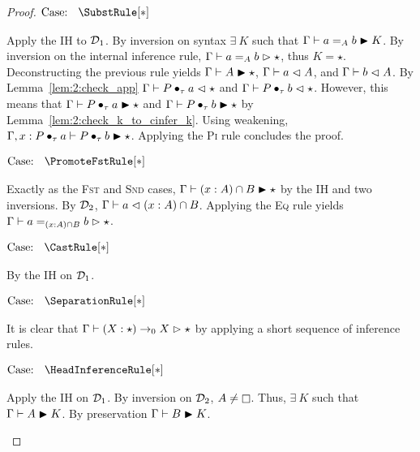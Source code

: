 \begin{proof}
    $\text{Case: }\begin{array}{c} \SubstRule[*] \end{array}$
    \begin{proofcase}
        Apply the IH to $\mathcal{D}_{1}$.
        By inversion on syntax $\exists\ K$ such that $\Gamma \vdash a =_A b \blacktriangleright K$.
        By inversion on the internal inference rule, $\Gamma \vdash a =_A b \vartriangleright \star$, thus $K = \star$.
        Deconstructing the previous rule yields $\Gamma \vdash A \blacktriangleright \star$, $\Gamma \vdash a \vartriangleleft A$, and $\Gamma \vdash b \vartriangleleft A$.
        By Lemma~\ref{lem:2:check_app} $\Gamma \vdash P \bullet_{\tau} a \vartriangleleft \star$ and $\Gamma \vdash P \bullet_{\tau} b \vartriangleleft \star$.
        However, this means that $\Gamma \vdash P \bullet_{\tau} a \blacktriangleright \star$ and $\Gamma \vdash P \bullet_{\tau} b \blacktriangleright \star$ by Lemma~\ref{lem:2:check_k_to_cinfer_k}.
        Using weakening, $\Gamma, x : P \bullet_{\tau} a \vdash P \bullet_{\tau} b \blacktriangleright \star$.
        Applying the \textsc{Pi} rule concludes the proof.
    \end{proofcase}

    $\text{Case: }\begin{array}{c} \PromoteFstRule[*] \end{array}$
    \begin{proofcase}
        Exactly as the \textsc{Fst} and \textsc{Snd} cases, $\Gamma \vdash (x : A) \cap B \blacktriangleright \star$ by the IH and two inversions.
        By $\mathcal{D}_{2}$, $\Gamma \vdash a \vartriangleleft (x : A) \cap B$.
        Applying the \textsc{Eq} rule yields $\Gamma \vdash a =_{(x : A) \cap B} b \vartriangleright \star$.
    \end{proofcase}

    $\text{Case: }\begin{array}{c} \CastRule[*] \end{array}$
    \begin{proofcase}
        By the IH on $\mathcal{D}_{1}$.
    \end{proofcase}

    $\text{Case: }\begin{array}{c} \SeparationRule[*] \end{array}$
    \begin{proofcase}
        It is clear that $\Gamma \vdash (X : \star) \to_0 X \vartriangleright \star$ by applying a short sequence of inference rules.
    \end{proofcase}

    $\text{Case: }\begin{array}{c} \HeadInferenceRule[*] \end{array}$
    \begin{proofcase}
        Apply the IH on $\mathcal{D}_{1}$.
        By inversion on $\mathcal{D}_{2}$, $A \neq \kind$.
        Thus, $\exists\ K$ such that $\Gamma \vdash A \blacktriangleright K$.
        By preservation $\Gamma \vdash B \blacktriangleright K$.
    \end{proofcase}


\end{proof}
